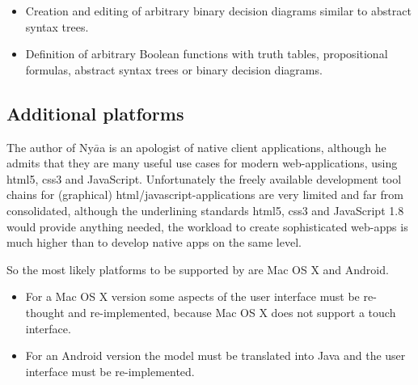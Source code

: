 \begin{itemize}

\item Creation and editing of arbitrary binary decision diagrams similar to abstract syntax trees.

\item Definition of arbitrary Boolean functions with truth tables, propositional formulas, abstract syntax trees or binary decision diagrams.

\end{itemize}


\subsection{Additional platforms}

The author of Ny$\bar{a}$a is an apologist of native client applications,
although he admits that they are many useful use cases for modern web-applications, 
using html5, css3 and JavaScript. 
Unfortunately the freely available development tool chains for (graphical) html/javascript-applications
are very limited and far from consolidated, although the underlining standards html5, css3 
and JavaScript 1.8 would provide anything needed, the workload to create sophisticated web-apps 
is much higher than to develop native apps on the same level.

So the most likely platforms to be supported by \Nyaya are Mac OS X and Android.

\begin{itemize}
\item
For a Mac OS X version some aspects of the user interface must be re-thought and re-implemented, 
because Mac OS X does not support a touch interface.
\item
For an Android version the model must be translated into Java and the user interface must be re-implemented.
\end{itemize}

